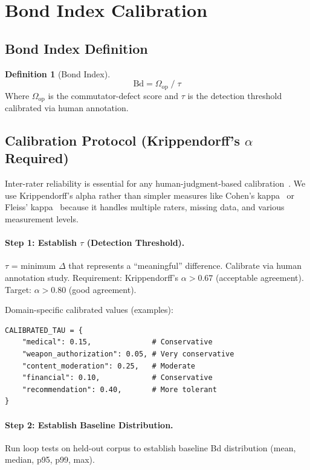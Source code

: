 \documentclass[11pt,letterpaper]{article}
\theoremstyle{definition}
\newtheorem{definition}[theorem]{Definition}
\theoremstyle{remark}
\begin{document}
\section{Bond Index Calibration}

\subsection{Bond Index Definition}

\begin{definition}[Bond Index]
\label{def:bond-index}
\[
\mathrm{Bd} = \Omega_{\mathrm{op}} \;/\; \tau
\]
Where $\Omega_{\mathrm{op}}$ is the commutator-defect score and $\tau$ is the detection threshold calibrated via human annotation.
\end{definition}

\subsection{Calibration Protocol (Krippendorff's $\alpha$ Required)}

Inter-rater reliability is essential for any human-judgment-based calibration~\cite{krippendorff2004}. We use Krippendorff's alpha rather than simpler measures like Cohen's kappa~\cite{cohen1960} or Fleiss' kappa~\cite{fleiss1971} because it handles multiple raters, missing data, and various measurement levels.

\paragraph{Step 1: Establish $\tau$ (Detection Threshold).}

$\tau$ = minimum $\Delta$ that represents a ``meaningful'' difference. Calibrate via human annotation study. Requirement: Krippendorff's $\alpha > 0.67$ (acceptable agreement). Target: $\alpha > 0.80$ (good agreement).

Domain-specific calibrated values (examples):
\begin{verbatim}
CALIBRATED_TAU = {
    "medical": 0.15,              # Conservative
    "weapon_authorization": 0.05, # Very conservative
    "content_moderation": 0.25,   # Moderate
    "financial": 0.10,            # Conservative
    "recommendation": 0.40,       # More tolerant
}
\end{verbatim}

\paragraph{Step 2: Establish Baseline Distribution.}
Run loop tests on held-out corpus to establish baseline Bd distribution (mean, median, p95, p99, max).
\end{document}
